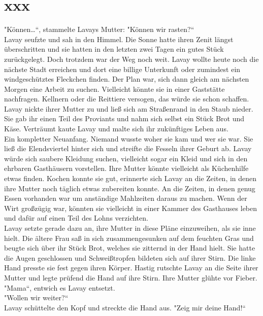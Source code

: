 \chapter{xxx}


"Können…``, stammelte Lavays Mutter: "Können wir rasten?``\\
Lavay seufzte und sah in den Himmel. Die Sonne hatte ihren Zenit längst überschritten und sie 
hatten in den letzten zwei Tagen ein gutes Stück zurückgelegt. Doch trotzdem war der Weg noch weit. 
Lavay wollte heute noch die nächste Stadt erreichen und dort eine billige Unterkunft oder 
zumindest ein windgeschütztes Fleckchen finden. Der Plan war, sich dann gleich am nächsten Morgen 
eine Arbeit zu suchen. Vielleicht könnte sie in einer Gaststätte nachfragen. Kellnern oder die 
Reittiere versogen, das würde sie schon schaffen. Lavay nickte ihrer Mutter zu und ließ sich am 
Straßenrand in den Staub nieder. Sie gab ihr einen Teil des Proviants und nahm sich selbst ein Stück 
Brot und Käse. Verträumt kaute Lavay und malte sich ihr zukünftiges Leben aus. \\
Ein kompletter Neuanfang. Niemand wusste woher sie kam und wer sie war. Sie ließ die Elendsviertel 
hinter sich und streifte die Fesseln ihrer Geburt ab. Lavay würde sich saubere Kleidung suchen, 
vielleicht sogar ein Kleid und sich in den ehrbaren Gasthäusern vorstellen. Ihre Mutter könnte 
vielleicht als Küchenhilfe etwas finden. Kochen konnte sie gut, erinnerte sich 
Lavay an die Zeiten, in denen ihre Mutter noch täglich etwas zubereiten konnte. An die Zeiten, in 
denen genug Essen vorhanden war um anständige Mahlzeiten daraus zu machen. Wenn der Wirt großzügig 
war, könnten sie vielleicht in einer Kammer des Gasthauses leben und dafür auf einen Teil des Lohns 
verzichten.\\
Lavay setzte gerade dazu an, ihre Mutter in diese Pläne einzuweihen, als sie inne hielt. Die ältere 
Frau saß in sich zusammengesunken auf dem feuchten Gras und beugte sich über ihr Stück Brot, 
welches sie zitternd in der Hand hielt. Sie hatte die Augen geschlossen und Schweißtropfen 
bildeten sich auf ihrer Stirn. Die linke Hand presste sie fest gegen ihren Körper. Hastig rutschte 
Lavay an die Seite ihrer Mutter und legte prüfend die Hand auf ihre Stirn. Ihre Mutter glühte vor 
Fieber.\\
"Mama``, entwich es Lavay entsetzt.\\
"Wollen wir weiter?``\\
Lavay schüttelte den Kopf und streckte die Hand aus. "Zeig mir deine Hand!``\\
